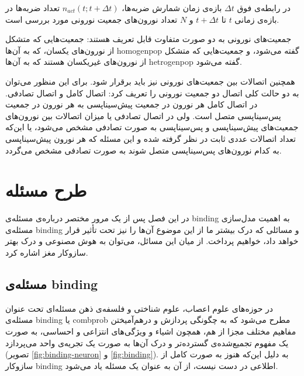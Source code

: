\documentclass[12pt]{report}
\begin{document}
	در رابطه‌ی فوق $\Delta t$ بازه‌ی زمان شمارش ضربه‌ها،
	$n_{act}(t; t+\Delta t)$
	تعداد ضربه‌ها در بازه‌ی زمانی $t$ تا $t + \Delta t$ و $N$ تعداد نورون‌های جمعیت نورونی مورد بررسی است.
	
	جمعیت‌های نورونی به دو صورت متفاوت قابل تعریف هستند: جمعیت‌هایی‌ که متشکل از نورون‌های یکسان، که به آن‌ها \gls{homogenpop} گفته می‌شود، و جمعیت‌هایی که متشکل از نورون‌های غیریکسان هستند که به آن‌ها \gls{hetrogenpop} گفته می‌شود.
	
	همچنین‌ اتصالات بین جمعیت‌های نورونی نیز باید برقرار شود. برای این منظور می‌توان به دو حالت کلی اتصال دو جمعیت نورونی را تعریف کرد: اتصال کامل و اتصال تصادفی. در اتصال کامل هر نورون در جمعیت پیش‌سیناپسی به هر نورون در جمعیت پس‌سیناپسی متصل است. ولی در اتصال تصادفی یا میزان اتصالات بین نورون‌های جمعیت‌های پیش‌سیناپسی و پس‌سیناپسی به صورت تصادفی مشخص می‌شود، یا این‌که تعداد اتصالات عددی ثابت در نظر گرفته شده و این مسئله که هر نورون پیش‌سیناپسی به کدام نورون‌های پس‌سیناپسی متصل شوند به صورت تصادفی مشخص می‌گردد.
	
	\chapter{طرح مسئله}
	
	در این فصل پس از یک مرور مختصر درباره‌ی مسئله‌ی \gls{binding} به اهمیت مدل‌سازی مسئله‌ی \gls{binding} و مسائلی که درک بیشتر ما از این موضوع آن‌ها را نیز تحت تأثیر قرار خواهد داد، خواهیم پرداخت. از میان این مسائل، می‌توان به هوش مصنوعی و درک بهتر ساز‌وکار مغز اشاره کرد.
	
	\section{مسئله‌ی \gls{binding}}
	
	در حوزه‌های علوم اعصاب، علوم شناختی و فلسفه‌ی ذهن مسئله‌ای تحت عنوان مسئله‌ی \gls{binding}
	یا \gls{combprob}
	مطرح می‌شود که به چگونگی پردازش و درهم‌آمیختن مفاهیم مختلف مجزا از هم، همچون اشیاء و ویژگی‌های انتزاعی و احساسی، به صورت یک مفهوم تجمیع‌شده‌ی گسترده‌تر و درک آن‌ها به صورت یک تجریه‌ی واحد می‌پردازد
	\cite{REVONSUO1999123, Feldman2012} (تصویر \ref{fig:binding-neuron} و \ref{fig:binding}).
	به دلیل این‌که هنوز به صورت کامل از سازوکار \gls{binding} اطلاعی در دست نیست، از آن به عنوان یک مسئله یاد می‌شود.
	
\end{document}
